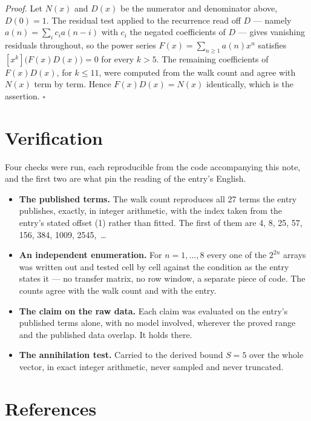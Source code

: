 \documentclass[11pt]{article}
\theoremstyle{definition}
\begin{document}
{\itshape Proof.} Let $N(x)$ and $D(x)$ be the numerator and denominator above, $D(0)=1$. The residual test applied to the recurrence read off $D$ --- namely $a(n) = \sum_i c_i a(n-i)$ with $c_i$ the negated coefficients of $D$ --- gives vanishing residuals throughout, so the power series $F(x)=\sum_{n\ge 1}a(n)x^n$ satisfies $[x^k]\bigl(F(x)D(x)\bigr) = 0$ for every $k > 5$. The remaining coefficients of $F(x)D(x)$, for $k \le 11$, were computed from the walk count and agree with $N(x)$ term by term. Hence $F(x)D(x) = N(x)$ identically, which is the assertion. $\square$

\section{Verification}

Four checks were run, each reproducible from the code accompanying this note, and the first two are what pin the reading of the entry's English.

\begin{itemize}

\item {\bfseries The published terms.} The walk count reproduces all 27 terms the entry publishes, exactly, in integer arithmetic, with the index taken from the entry's stated offset (1) rather than fitted. The first of them are 4, 8, 25, 57, 156, 384, 1009, 2545,~\dots

\item {\bfseries An independent enumeration.} For $n = 1,\dots,8$ every one of the $2^{2n}$ arrays was written out and tested cell by cell against the condition as the entry states it --- no transfer matrix, no row window, a separate piece of code. The counts agree with the walk count and with the entry.

\item {\bfseries The claim on the raw data.} Each claim was evaluated on the entry's published terms alone, with no model involved, wherever the proved range and the published data overlap. It holds there.

\item {\bfseries The annihilation test.} Carried to the derived bound $S = 5$ over the whole vector, in exact integer arithmetic, never sampled and never truncated.

\end{itemize}

\section{References}
\end{document}
